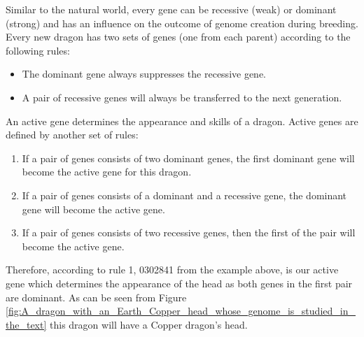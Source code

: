 \documentclass[12pt]{article}
\begin{document}
Similar to the natural world, every gene can be recessive (weak) or dominant (strong) and has an influence on the outcome of genome creation during breeding. Every new dragon has two sets of genes (one from each parent) according to the following rules:
\begin{itemize}
	\item The dominant gene always suppresses the recessive gene.
	\item A pair of recessive genes will always be transferred to the next generation.
\end{itemize}

An active gene determines the appearance and skills of a dragon. Active genes are defined by another set of rules:

\begin{enumerate}
	\item If a pair of genes consists of two dominant genes, the first dominant gene will become the active gene for this dragon.
	\item If a pair of genes consists of a dominant and a recessive gene, the dominant gene will become the active gene.
	\item If a pair of genes consists of two recessive genes, then the first of the pair will become the active gene.
\end{enumerate}

Therefore, according to rule 1, 0302841 from the example above, is our active gene which determines the appearance of the head as both genes in the first pair are dominant. As can be seen from Figure \ref{fig:A_dragon_with_an_Earth_Copper_head_whose_genome_is_studied_in_the_text} this dragon will have a Copper dragon's head.\par
\end{document}
